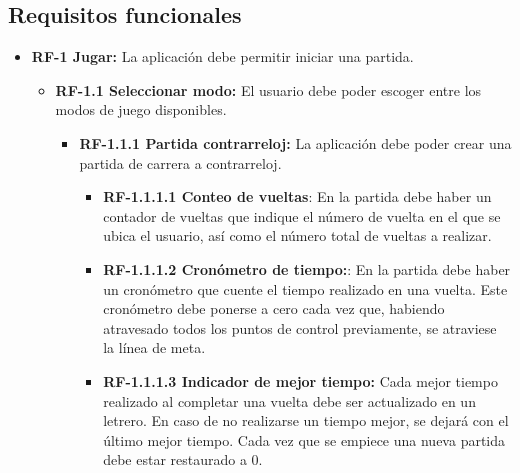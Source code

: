 \subsection{Requisitos funcionales}
\begin{itemize}
\tightlist
\item 
	\textbf{RF-1 Jugar:} La aplicación debe permitir iniciar una partida.
	
	\begin{itemize}
    \tightlist
    \item
      	\textbf{RF-1.1 Seleccionar modo:} El usuario debe poder escoger entre los modos de juego disponibles.
      	
      	\begin{itemize}
		\tightlist
		\item
			\textbf{RF-1.1.1 Partida contrarreloj:} La aplicación debe poder crear una partida de carrera a contrarreloj.			
			\begin{itemize}
			\tightlist
				\item \textbf{RF-1.1.1.1 Conteo de vueltas}: En la partida debe haber un contador de vueltas que indique el número de vuelta en el que se ubica el usuario, así como el número total de vueltas a realizar.
				\item \textbf{RF-1.1.1.2 Cronómetro de tiempo:}: En la partida debe haber un cronómetro que cuente el tiempo realizado en una vuelta. Este cronómetro debe ponerse a cero cada vez que, habiendo atravesado todos los puntos de control previamente, se atraviese la línea de meta.
				\item \textbf{RF-1.1.1.3 Indicador de mejor tiempo:} Cada mejor tiempo realizado al completar una vuelta debe ser actualizado en un letrero. En caso de no realizarse un tiempo mejor, se dejará con el último mejor tiempo. Cada vez que se empiece una nueva partida debe estar restaurado a 0.
			\end{itemize}
    	

\end{itemize}
\end{itemize}
\end{itemize}
